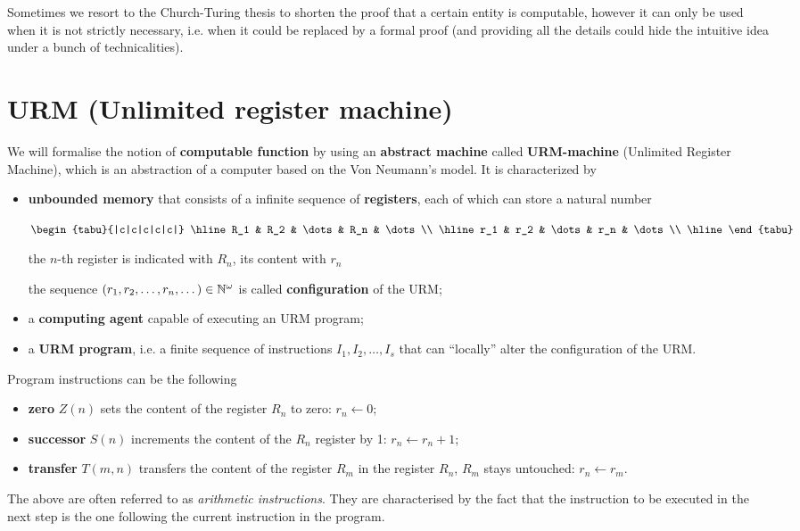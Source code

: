 Sometimes we resort to the Church-Turing thesis to shorten the proof that a certain entity is computable, however it can only be used when it is not strictly necessary, i.e. when it could be replaced by a formal proof
(and providing all the details could hide the intuitive idea under a bunch of technicalities).

\section{URM (Unlimited register machine)}

We will formalise the notion of \textbf{computable function} by using an \textbf{abstract machine} 
called \textbf{URM-machine} (Unlimited Register Machine), 
which is an abstraction of a computer based on the Von Neumann's model. It is characterized by

\begin{itemize}
\item \textbf{unbounded memory} that consists of a infinite sequence of \textbf{registers}, each of which can store a  natural number


  $\begin{tabu}{|c|c|c|c|c|}
    \hline
    R_1 & R_2 & \dots & R_n & \dots \\
    \hline
    r_1 & r_2 & \dots & r_n & \dots \\
    \hline
  \end{tabu}$

  the $n$-th register is indicated with $R_n$, its content with $r_n$

  the sequence $(r_1, r_2,\dots, r_n,\dots) \in \mathbb{N}^\omega$ is called
  \textbf{configuration} of the URM;

\item a \textbf{computing agent} capable of executing an URM program;

\item  a \textbf{URM program}, i.e. a finite sequence of instructions
  $I_1, I_2, \dots, I_s$ that can ``locally'' alter the configuration
  of the URM.
\end{itemize}


Program instructions can be the following

\begin{itemize}

\item \textbf{zero} $Z(n)$ sets the content of the register $R_n$ to zero: $r_n \leftarrow 0$;

\item \textbf{successor} $S(n)$ increments the content of the $R_n$ register by 1: $r_n \leftarrow r_n+1$;

\item \textbf{transfer} $T(m,n)$ transfers the content of the register $R_m$ in the register $R_n$, $R_m$ stays untouched: $r_n\leftarrow r_m$.
\end{itemize}
The above are often referred to as \emph{arithmetic instructions}. They are characterised by the fact that the instruction to be executed in the next step
 is the one following the current instruction in the program.

